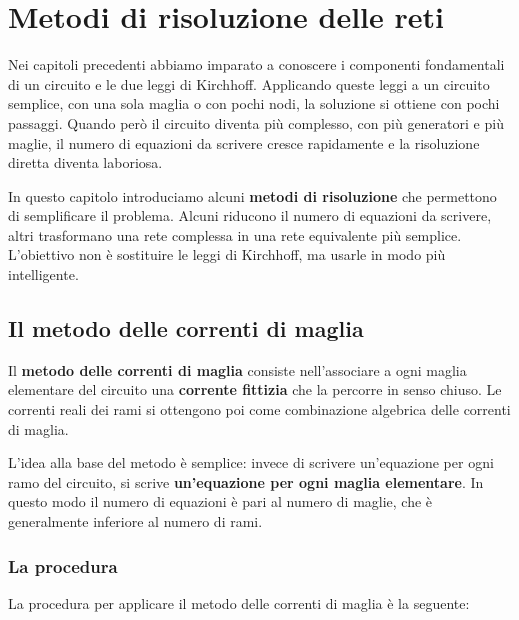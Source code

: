 
\chapter{Metodi di risoluzione delle reti}

\begin{concetto}
Nei capitoli precedenti abbiamo imparato a conoscere i componenti fondamentali di un circuito e le due leggi di Kirchhoff. Applicando queste leggi a un circuito semplice, con una sola maglia o con pochi nodi, la soluzione si ottiene con pochi passaggi. Quando però il circuito diventa più complesso, con più generatori e più maglie, il numero di equazioni da scrivere cresce rapidamente e la risoluzione diretta diventa laboriosa.

In questo capitolo introduciamo alcuni \textbf{metodi di risoluzione} che permettono di semplificare il problema. Alcuni riducono il numero di equazioni da scrivere, altri trasformano una rete complessa in una rete equivalente più semplice. L'obiettivo non è sostituire le leggi di Kirchhoff, ma usarle in modo più intelligente.
\end{concetto}

\section{Il metodo delle correnti di maglia}

\begin{concetto}
Il \textbf{metodo delle correnti di maglia} consiste nell'associare a ogni maglia elementare del circuito una \textbf{corrente fittizia} che la percorre in senso chiuso. Le correnti reali dei rami si ottengono poi come combinazione algebrica delle correnti di maglia.
\end{concetto}

L'idea alla base del metodo è semplice: invece di scrivere un'equazione per ogni ramo del circuito, si scrive \textbf{un'equazione per ogni maglia elementare}. In questo modo il numero di equazioni è pari al numero di maglie, che è generalmente inferiore al numero di rami.

\subsection{La procedura}

La procedura per applicare il metodo delle correnti di maglia è la seguente:

